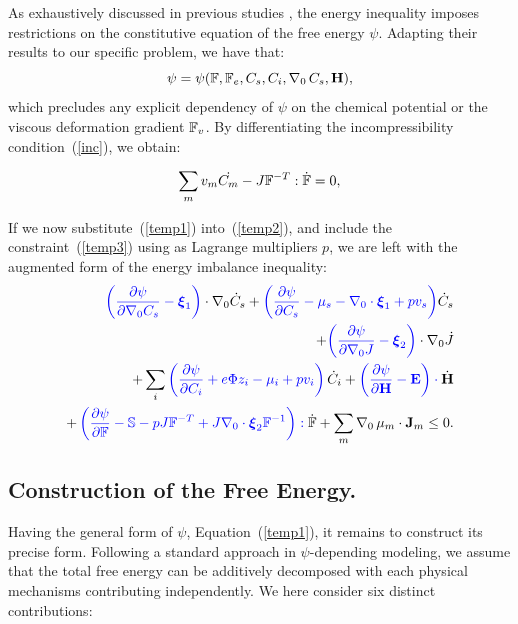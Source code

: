 As exhaustively discussed in previous studies \cite{Plasto,GURTIN}, the energy inequality imposes restrictions on the constitutive equation of the free energy $\psi$. Adapting their results to our specific problem, we have that:
\begin{equation}
\psi = \psi (\mathbb{F},\mathbb{F}_e, C_s, C_i, \nabla_0 \,C_s,\mathbf{H}), \label{temp1}
\end{equation}
which precludes any explicit dependency of $\psi$ on the chemical potential or the viscous deformation gradient $\mathbb{F}_v$. By differentiating the incompressibility condition~(\ref{inc}), we obtain:

\begin{gather}
\sum_m v_m\dot{C_m} - J \mathbb{F}^{-T}:\dot{\mathbb{F}} =0, \label{temp3}
\end{gather}

If we now substitute~(\ref{temp1}) into~(\ref{temp2}), and include the constraint~(\ref{temp3}) using as Lagrange multipliers $p$, we are left with the augmented form of the energy imbalance inequality:
\begin{equation}
\begin{aligned}
\color{blue}{\left(\frac{\partial \psi}{\partial \nabla_0 C_s}-\boldsymbol{\xi}_1\right)} \color{black}\cdot \nabla_0 \dot{C}_s + \color{blue}{\left(\frac{\partial \psi}{\partial C_s}-\mu_s-\nabla_0 \cdot \boldsymbol{\xi}_1+p v_s\right)}\color{black}\dot{C}_s\\
+\color{blue}{\left(\frac{\partial \psi}{\partial \nabla_0 J}-\boldsymbol{\xi}_2\right)} \color{black}\cdot \nabla_0 \dot{J}\\
+ \sum_i\color{blue}\left(\frac{\partial \psi}{\partial C_i} + e\Phi z_i-\mu_i+pv_i\right) \color{black}\dot{C}_i +\color{blue}\left(\frac{\partial \psi}{\partial \mathbf{H}}-\mathbf{E}\right) \cdot \color{black}\dot{\mathbf{H}}\\
+ \color{blue} \left(\frac{\partial \psi}{\partial \mathbb{F}} - \mathbb{S} - p J \mathbb{F}^{-T}+J\nabla_0 \cdot \boldsymbol{\xi}_2\mathbb{F}^{-1}\right): \color{black}\dot{\mathbb{F}}+ \sum_m \nabla_0 \,\mu_m \cdot \mathbf{J}_m \leq 0 . \label{ineq}
\end{aligned}
\end{equation}

\subsection{Construction of the Free Energy.}

Having the general form of $\psi$, Equation~(\ref{temp1}), it remains to construct its precise form. Following a standard approach in $\psi$-depending modeling, we assume that the total free energy can be additively decomposed with each physical mechanisms contributing independently. We here consider six distinct contributions:

